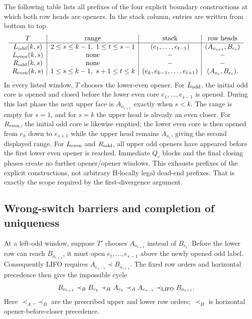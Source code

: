 \documentclass[11pt]{article}
\theoremstyle{definition}
\theoremstyle{remark}
\begin{document}
The following table lists all prefixes of the four explicit boundary
constructions at which both row heads are openers. In the stack column,
entries are written from bottom to top.
\[
\begin{array}{c|c|c|c}
T&\text{range}&\text{stack}&\text{row heads}\\\hline
L_{\rm odd}(k,s)&2\le s\le k-1,\ 1\le t\le s-1
 &(e_1,\ldots,e_{t-1})&(A_{o_{s+1}},B_{e_t})\\
L_{\rm even}(k,s)&\text{none}&-&-\\
R_{\rm odd}(k,s)&\text{none}&-&-\\
R_{\rm even}(k,s)&1\le s\le k-1,\ s+1\le t\le k
 &(e_k,e_{k-1},\ldots,e_{t+1})&(A_{o_s},B_{e_t}).
\end{array}
\]
In every listed window, $T$ chooses the lower-even opener.
For $L_{\rm odd}$, the initial odd core is opened and closed before the
lower even core $e_1,\ldots,e_{s-1}$ is opened. During this last phase
the next upper face is $A_{o_{s+1}}$ exactly when $s<k$. The range is
empty for $s=1$, and for $s=k$ the upper head is already an even closer.
For $R_{\rm even}$, the initial odd core is likewise emptied; the lower
even core is then opened from $e_k$ down to $e_{s+1}$ while the upper
head remains $A_{o_s}$, giving the second displayed range.
For $L_{\rm even}$ and $R_{\rm odd}$, all upper odd openers have appeared
before the first lower even opener is reached. Immediate $Q_c$ blocks
and the final closing phases create no further opener/opener windows.
This exhausts prefixes of the explicit constructions, not arbitrary
H-locally legal dead-end prefixes. That is exactly the scope required
by the first-divergence argument.

\subsection{Wrong-switch barriers and completion of
uniqueness}\label{d.9.-wrong-switch-barriers}

At a left-odd window, suppose $T'$ chooses $A_{o_{s+1}}$ instead of
$B_{e_t}$. Before the lower row can reach $B_{o_{s+1}}$, it must open
$e_t,\ldots,e_{s-1}$ above the newly opened odd label. Consequently
LIFO requires $A_{e_{s-1}}\prec B_{o_{s+1}}$. The fixed row orders and
horizontal precedence then give the impossible cycle
\[
 B_{o_{s+1}}
 \mathrel{\prec_B} B_{e_k}
 \mathrel{\prec_H} A_{e_k}
 \mathrel{\prec_A} A_{e_{s-1}}
 \mathrel{\prec_{\rm LIFO}} B_{o_{s+1}}.
\]
Here $\prec_A,\prec_B$ are the prescribed upper and lower row orders;
$\prec_H$ is horizontal opener-before-closer precedence.
\end{document}
